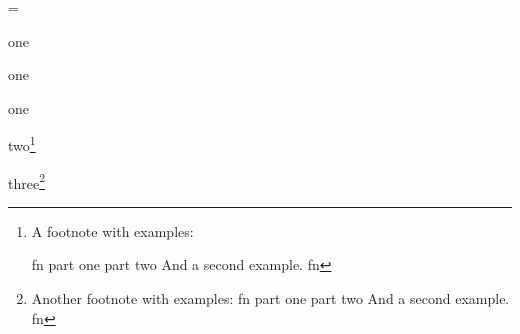 


\def\fnexnoprint{(\romannumeral\the\excnt)}
\everyfootnote={%
   \tenpoint
   \noindent
   \keepexcntlocal
   \let\exnoprint=\fnexnoprint
}
\def\specialexnoprint{[\lingspecialexno]}
\def\raiseexcnt{\xdef\resetexcnt{\noindent\excnt=\the\excnt}%
   \aftergroup\resetexcnt}

\ex one\xe


\ex one\xe


\ex[exno=75] one\xe

\ex two\footnote{%
A footnote with examples:

\pex fn
\a part one
\a part two
\xe
And a second example.
\ex[belowexskip=0pt] fn\xe
}\xe

\ex three\footnote{%
Another footnote with examples:
\pex[exno={13, p. 49},labelanchor=numleft] fn
\a part one
\a part two
\xe
And a second example.
\ex fn\xe
}\xe

\endinput




\def\emwidth#1#2{\dimen0=#1 \dimen1=1em
   \dimen0=256\dimen0
   \divide\dimen1 by 256
   \divide\dimen0 by \dimen1
   \edef#2{\the\dimen0}\ignorespaces}
\emwidth{6pt}\foop
\def\foop{0.05pt}
\def\ggg#1pt{#1em}
{\expandafter\ggg\foop}

